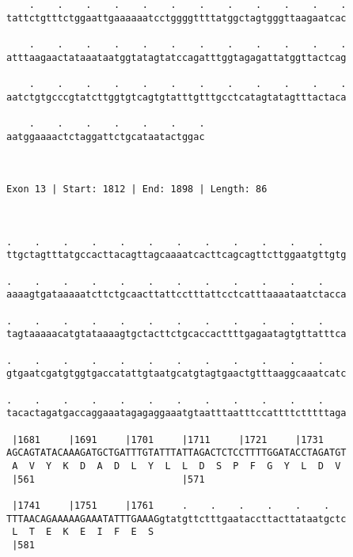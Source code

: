 \documentclass{article}
\begin{document}
\begin{Verbatim}
    .    .    .    .    .    .    .    .    .    .    .    .
tattctgtttctggaattgaaaaaatcctggggttttatggctagtgggttaagaatcac
                                                            
    .    .    .    .    .    .    .    .    .    .    .    .
atttaagaactataaataatggtatagtatccagatttggtagagattatggttactcag
                                                            
    .    .    .    .    .    .    .    .    .    .    .    .
aatctgtgcccgtatcttggtgtcagtgtatttgtttgcctcatagtatagtttactaca
                                                            
    .    .    .    .    .    .    .
aatggaaaactctaggattctgcataatactggac
                                   
                                   
 
Exon 13 | Start: 1812 | End: 1898 | Length: 86



.    .    .    .    .    .    .    .    .    .    .    .    
ttgctagtttatgccacttacagttagcaaaatcacttcagcagttcttggaatgttgtg
                                                            
.    .    .    .    .    .    .    .    .    .    .    .    
aaaagtgataaaaatcttctgcaacttattcctttattcctcatttaaaataatctacca
                                                            
.    .    .    .    .    .    .    .    .    .    .    .    
tagtaaaaacatgtataaaagtgctacttctgcaccacttttgagaatagtgttatttca
                                                            
.    .    .    .    .    .    .    .    .    .    .    .    
gtgaatcgatgtggtgaccatattgtaatgcatgtagtgaactgtttaaggcaaatcatc
                                                            
.    .    .    .    .    .    .    .    .    .    .    .    
tacactagatgaccaggaaatagagaggaaatgtaatttaatttccattttctttttaga
                                                            
 |1681     |1691     |1701     |1711     |1721     |1731    
AGCAGTATACAAAGATGCTGATTTGTATTTATTAGACTCTCCTTTTGGATACCTAGATGT
 A  V  Y  K  D  A  D  L  Y  L  L  D  S  P  F  G  Y  L  D  V 
 |561                          |571                         
  
 |1741     |1751     |1761     .    .    .    .    .    .   
TTTAACAGAAAAAGAAATATTTGAAAGgtatgttctttgaataccttacttataatgctc
 L  T  E  K  E  I  F  E  S                                  
 |581                                                       
  

\end{Verbatim}
\end{document}
